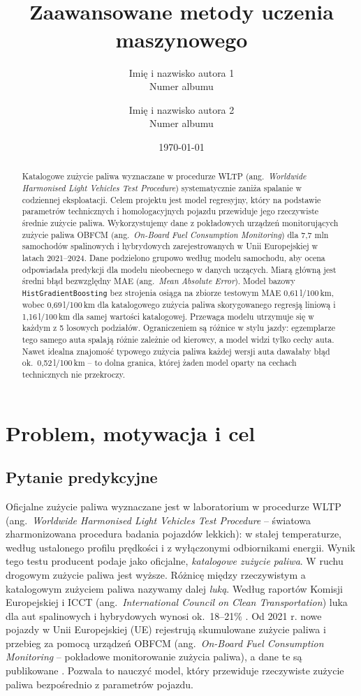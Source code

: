 \documentclass[10pt,twocolumn,a4paper]{article}
\title{\TematProjektu\\[2mm]
\large Zaawansowane metody uczenia maszynowego}
\author{Imię i nazwisko autora 1\\\small Numer albumu
\and Imię i nazwisko autora 2\\\small Numer albumu}
\date{\quad \today}
\newcommand{\lkm}{\,l/100\,km}
\begin{document}
\maketitle

\begin{abstract}
Katalogowe zużycie paliwa wyznaczane w procedurze WLTP (ang.\ \emph{Worldwide
Harmonised Light Vehicles Test Procedure}) systematycznie zaniża spalanie
w codziennej eksploatacji. Celem projektu jest model regresyjny, który na
podstawie parametrów technicznych i homologacyjnych pojazdu przewiduje jego
rzeczywiste średnie zużycie paliwa. Wykorzystujemy dane z pokładowych urządzeń
monitorujących zużycie paliwa OBFCM (ang.\ \emph{On-Board Fuel Consumption
Monitoring}) dla 7,7 mln samochodów spalinowych i hybrydowych zarejestrowanych
w Unii Europejskiej w latach 2021--2024. Dane podzielono grupowo według modelu
samochodu, aby ocena odpowiadała predykcji dla modelu nieobecnego w danych
uczących. Miarą główną jest średni błąd bezwzględny MAE (ang.\ \emph{Mean
Absolute Error}). Model bazowy \texttt{HistGradientBoosting} bez strojenia
osiąga na zbiorze testowym MAE 0,61\lkm, wobec 0,69\lkm{} dla katalogowego
zużycia paliwa skorygowanego regresją liniową i 1,16\lkm{} dla samej wartości
katalogowej. Przewaga modelu utrzymuje się w każdym z 5 losowych podziałów.
Ograniczeniem są różnice w stylu jazdy: egzemplarze tego samego auta spalają
różnie zależnie od kierowcy, a model widzi tylko cechy auta. Nawet idealna
znajomość typowego zużycia paliwa każdej wersji auta dawałaby błąd ok.\
0,52\lkm{} -- to dolna granica, której żaden model oparty na cechach
technicznych nie przekroczy.
\end{abstract}

\section{Problem, motywacja i cel}
\subsection{Pytanie predykcyjne}
Oficjalne zużycie paliwa wyznaczane jest w laboratorium w procedurze WLTP
(ang.\ \emph{Worldwide Harmonised Light Vehicles Test Procedure} -- światowa
zharmonizowana procedura badania pojazdów lekkich): w stałej temperaturze,
według ustalonego profilu prędkości i z wyłączonymi odbiornikami energii.
Wynik tego testu producent podaje jako oficjalne, \emph{katalogowe zużycie
paliwa}. W ruchu drogowym zużycie paliwa jest wyższe. Różnicę między
rzeczywistym a katalogowym zużyciem paliwa nazywamy dalej \emph{luką}.
Według raportów Komisji Europejskiej i ICCT (ang.\ \emph{International
Council on Clean Transportation}) luka dla aut spalinowych i hybrydowych
wynosi ok.\ 18--21\% \cite{ec2024report,diaz2026obfcm}. Od 2021 r. nowe
pojazdy w Unii Europejskiej (UE) rejestrują skumulowane zużycie paliwa
i przebieg za pomocą urządzeń OBFCM (ang.\ \emph{On-Board Fuel Consumption
Monitoring} -- pokładowe monitorowanie zużycia paliwa), a dane te są
publikowane \cite{reg2019_631,eea2024obfcm}. Pozwala to nauczyć model, który
przewiduje rzeczywiste zużycie paliwa bezpośrednio z parametrów pojazdu.
\end{document}
